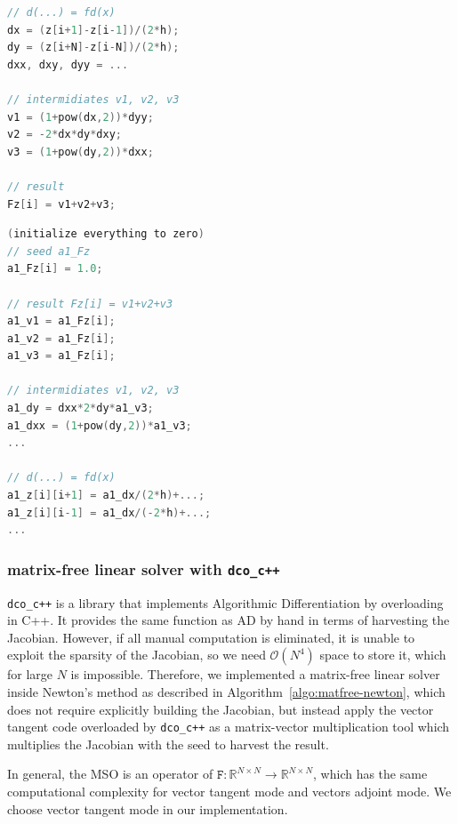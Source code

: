 \documentclass[11pt]{scrartcl}
\begin{document}
\noindent
\begin{minipage}[t]{0.45\linewidth}
\begin{lstlisting}[caption={Adjoint SAC Code for inner gridpoint $i$ (primal/forward)},label=lst:prsac,language=C++]
// d(...) = fd(x)
dx = (z[i+1]-z[i-1])/(2*h);
dy = (z[i+N]-z[i-N])/(2*h);
dxx, dxy, dyy = ...

// intermidiates v1, v2, v3
v1 = (1+pow(dx,2))*dyy;
v2 = -2*dx*dy*dxy;
v3 = (1+pow(dy,2))*dxx;

// result
Fz[i] = v1+v2+v3;
\end{lstlisting}
\end{minipage}\hfill
\begin{minipage}[t]{0.53\linewidth}
\begin{lstlisting}[caption={Adjoint SAC Code for inner gridpoint $i$ (adjoint/reverse)},label=lst:adsac,language=C++]
(initialize everything to zero)
// seed a1_Fz
a1_Fz[i] = 1.0;

// result Fz[i] = v1+v2+v3
a1_v1 = a1_Fz[i];
a1_v2 = a1_Fz[i];
a1_v3 = a1_Fz[i];

// intermidiates v1, v2, v3
a1_dy = dxx*2*dy*a1_v3;
a1_dxx = (1+pow(dy,2))*a1_v3;
...

// d(...) = fd(x)
a1_z[i][i+1] = a1_dx/(2*h)+...;
a1_z[i][i-1] = a1_dx/(-2*h)+...;
...
\end{lstlisting}
\end{minipage}

\subsubsection{matrix-free linear solver with \texttt{dco\_c++}}
\texttt{dco\_c++} is a library that implements Algorithmic Differentiation by overloading in C++. It provides the same function as AD by hand in terms of harvesting the Jacobian. However, if all manual computation is eliminated, it is unable to exploit the sparsity of the Jacobian, so we need $\mathcal{O}(N^4)$ space to store it, which for large $N$ is impossible. Therefore, we implemented a matrix-free linear solver inside Newton's method as described in Algorithm~\ref{algo:matfree-newton}, which does not require explicitly building the Jacobian, but instead apply the vector tangent code overloaded by \texttt{dco\_c++} as a matrix-vector multiplication tool which multiplies the Jacobian with the seed to harvest the result.

In general, the MSO is an operator of $ \mathtt{F}: \mathbb{R}^{N\times N}\rightarrow \mathbb{R}^{N\times N} $, which has the same computational complexity for vector tangent mode and vectors adjoint mode. We choose vector tangent mode in our implementation.
\end{document}
